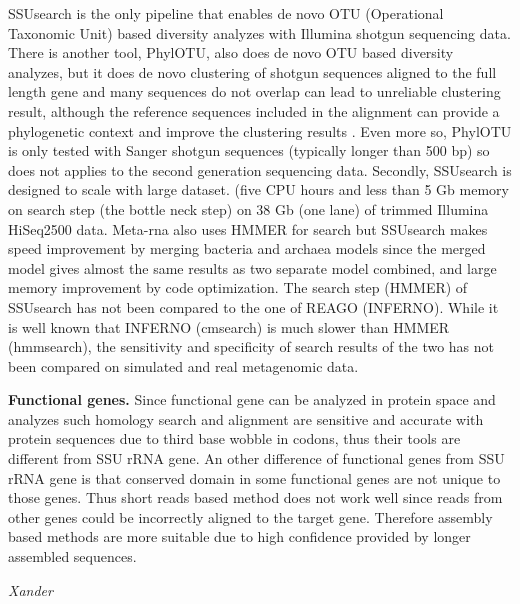 \documentclass[]{msu-thesis}
\begin{document}
SSUsearch is the only pipeline that enables de novo OTU (Operational
Taxonomic Unit) based diversity analyzes with Illumina shotgun
sequencing data. There is another tool, PhylOTU, also does de novo OTU
based diversity analyzes, but it does de novo clustering of shotgun
sequences aligned to the full length gene and many sequences do not
overlap can lead to unreliable clustering result, although the
reference sequences included in the alignment can provide a
phylogenetic context and improve the clustering results
\cite{sharpton_phylotu:_2011}. Even more so, PhylOTU is only tested
with Sanger shotgun sequences (typically longer than 500 bp) so does
not applies to the second generation sequencing data.  Secondly,
SSUsearch is designed to scale with large dataset. (five CPU hours and
less than 5 Gb memory on search step (the bottle neck step) on 38 Gb
(one lane) of trimmed Illumina HiSeq2500 data. Meta-rna
\cite{huang_identification_2009} also uses HMMER for search but
SSUsearch makes speed improvement by merging bacteria and archaea
models since the merged model gives almost the same results as two
separate model combined, and large memory improvement by code
optimization.  The search step (HMMER) of SSUsearch has not been
compared to the one of REAGO (INFERNO). While it is well known that
INFERNO (cmsearch) is much slower than HMMER (hmmsearch), the
sensitivity and specificity of search results of the two has not been
compared on simulated and real metagenomic data.

\textbf{Functional genes.}  Since functional gene can be analyzed in
protein space and analyzes such homology search and alignment are
sensitive and accurate with protein sequences due to third base wobble
in codons, thus their tools are different from SSU rRNA gene. An other
difference of functional genes from SSU rRNA gene is that conserved
domain in some functional genes are not unique to those genes. Thus
short reads based method does not work well since reads from other
genes could be incorrectly aligned to the target gene. Therefore
assembly based methods are more suitable due to high confidence
provided by longer assembled sequences.

\textit{Xander}
\end{document}
